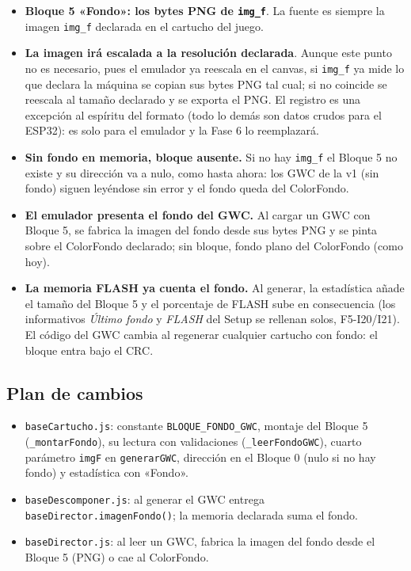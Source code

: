 \begin{itemize}
	\item \textbf{Bloque 5 «Fondo»: los bytes PNG de \texttt{img\_f}}. La fuente es siempre la imagen \texttt{img\_f} declarada en el cartucho del juego.
	\item \textbf{La imagen irá escalada a la resolución declarada}. Aunque este punto no es necesario, pues el emulador ya reescala en el canvas, si \texttt{img\_f} ya mide lo que declara la máquina se copian sus bytes PNG tal cual; si no coincide se reescala al tamaño declarado y se exporta el PNG. El registro es una excepción al espíritu del formato (todo lo demás son datos crudos para el ESP32): es solo para el emulador y la Fase 6 lo reemplazará.
	
	\item \textbf{Sin fondo en memoria, bloque ausente.} Si no hay \texttt{img\_f} el Bloque 5 no existe y su dirección va a nulo, como hasta ahora: los GWC de la v1 (sin fondo) siguen leyéndose sin error y el fondo queda del ColorFondo.
	\item \textbf{El emulador presenta el fondo del GWC.} Al cargar un GWC con Bloque 5, se fabrica la imagen del fondo desde sus bytes PNG y se pinta sobre el ColorFondo declarado; sin bloque, fondo plano del ColorFondo (como hoy).
	\item \textbf{La memoria FLASH ya cuenta el fondo.} Al generar, la estadística añade el tamaño del Bloque 5 y el porcentaje de FLASH sube en consecuencia (los informativos \emph{Último fondo} y \emph{FLASH} del Setup se rellenan solos, F5-I20/I21). El código del GWC cambia al regenerar cualquier cartucho con fondo: el bloque entra bajo el CRC.
\end{itemize}

\subsection{Plan de cambios}
\label{sec:F5I22Plan}

\begin{itemize}
	\item \texttt{baseCartucho.js}: constante \texttt{BLOQUE\_FONDO\_GWC}, montaje del Bloque 5 (\texttt{\_montarFondo}), su lectura con validaciones (\texttt{\_leerFondoGWC}), cuarto parámetro \texttt{imgF} en \texttt{generarGWC}, dirección en el Bloque 0 (nulo si no hay fondo) y estadística con «Fondo».
	\item \texttt{baseDescomponer.js}: al generar el GWC entrega \texttt{baseDirector.imagenFondo()}; la memoria declarada suma el fondo.
	\item \texttt{baseDirector.js}: al leer un GWC, fabrica la imagen del fondo desde el Bloque 5 (PNG) o cae al ColorFondo.
\end{itemize}

